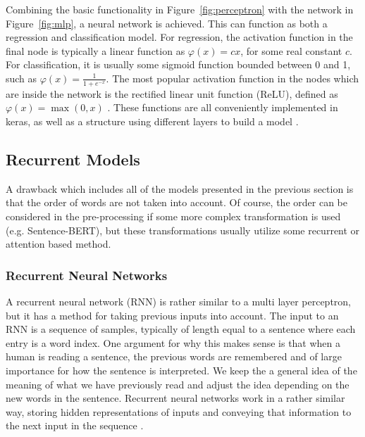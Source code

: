 Combining the basic functionality in Figure~\ref{fig:perceptron} with the network in Figure~\ref{fig:mlp}, a neural network is achieved. This can function as both a regression and classification model. For regression, the activation function in the final node is typically a linear function as $\varphi(x) = cx$, for some real constant $c$. For classification, it is usually some sigmoid function bounded between 0 and 1, such as $\displaystyle{\varphi(x) = \frac{1}{1 + e^{-x}}}$. The most popular activation function in the nodes which are inside the network is the rectified linear unit function (ReLU), defined as $\varphi(x) = \max(0,x)$ \citep{Goodfellow-et-al-2016}. These functions are all conveniently implemented in keras, as well as a structure using different layers to build a model \citep{chollet2020keras}. 

\subsection{Recurrent Models}\label{sec:recmods}

A drawback which includes all of the models presented in the previous section is that the order of words are not taken into account. Of course, the order can be considered in the pre-processing if some more complex transformation is used (e.g. Sentence-BERT), but these transformations usually utilize some recurrent or attention based method. 

\subsubsection{Recurrent Neural Networks}

A recurrent neural network (RNN) is rather similar to a multi layer perceptron, but it has a method for taking previous inputs into account. The input to an RNN is a sequence of samples, typically of length equal to a sentence where each entry is a word index. One argument for why this makes sense is that when a human is reading a sentence, the previous words are remembered and of large importance for how the sentence is interpreted. We keep the a general idea of the meaning of what we have previously read and adjust the idea depending on the new words in the sentence. Recurrent neural networks work in a rather similar way, storing hidden representations of inputs and conveying that information to the next input in the sequence \citep{Goodfellow-et-al-2016}. 

